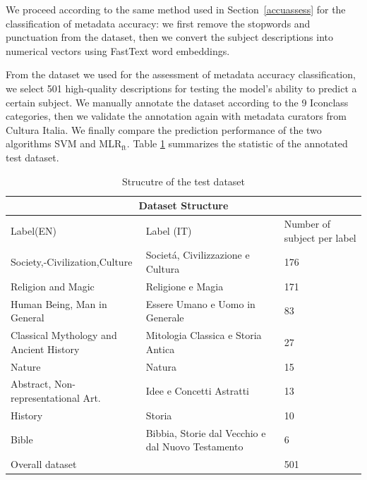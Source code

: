 \documentclass[epsfig,a4paper,12pt,titlepage]{book}
\newcommand{\mlr}{MLR$_\text{ft}$\xspace}
\begin{document}
We proceed according to the same method used in Section~\ref{accuassess} for the classification of metadata accuracy: we first remove the stopwords and punctuation from the dataset, then we convert the subject descriptions into numerical vectors using FastText word embeddings.

From the dataset we used for the assessment of metadata accuracy classification, we select 501 high-quality descriptions for testing the model's ability to predict a certain subject. We manually annotate the dataset according to the 9 Iconclass categories, then we validate the annotation again with metadata curators from Cultura Italia. 
We finally compare the prediction performance of the two algorithms SVM and \mlr. Table \ref{tab:anno_test} summarizes the statistic of the annotated test dataset.

\begin{table}[h!]
\centering
\begin{adjustbox}{width=\textwidth}
\begin{tabular}{|p{4.5cm}|p{4.5cm}|p{5.0cm}|} \hline

\hline
\multicolumn{3}{|c|}{Dataset Structure} \\
\hline
Label(EN)  & Label (IT) & Number of subject per label \\ \hline
Society,\hyp{Civilization},Culture & Societ\'a, Civilizzazione e Cultura & 176 \\ \hline
Religion and Magic & Religione e Magia	& 171 \\ \hline
Human Being, Man in General	& Essere Umano e Uomo in Generale & 83 \\ \hline
Classical Mythology and Ancient History& Mitologia Classica e Storia Antica	& 27\\ \hline
Nature & Natura &	15 \\ \hline
Abstract, Non-representational Art.	& Idee e Concetti Astratti & 13\\ \hline
History	& Storia & 10\\ \hline \hline
Bible & Bibbia, Storie dal Vecchio e dal Nuovo Testamento & 6 \\ \hline

Overall dataset & &	501\\ \hline
\hline
\end{tabular}
\end{adjustbox}
\caption{Strucutre of the test dataset}
\label{tab:anno_test}       %
\end{table}
\end{document}
